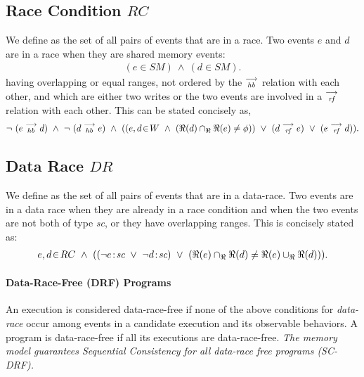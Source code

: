         \subsection{Race Condition $RC$} 
            We define  as the set of all pairs of events that are in a race. 
            Two events $e$ and $d$ are in a race when they are shared memory events:
            \begin{align*}
                (e \in SM)\ \wedge\ (d \in SM).
            \end{align*}
            having overlapping or equal ranges, not ordered by the $\stackrel{\longrightarrow}{_\textit{hb}}$ relation with each other, and which are either two writes or the two events are involved in a $\stackrel{\longrightarrow}{_\textit{rf}}$ relation with each other. 
            This can be stated concisely as,
            \begin{align*}
                \neg \ (\reln{e}{hb}{d})\ \wedge\ \neg \ (\reln{d}{hb}{e}) 
                \ \wedge \ 
                (
                (\event{e,d}{W}\  \wedge\ (\Re(d) \cap_{\Re} \Re(e) \neq \phi)) 
                    \  \vee\ (d \stck{_\textit{rf}} e)\ \vee\ (e \stck{_\textit{rf}} d)
                ).
            \end{align*}
                    
        \subsection{Data Race $DR$} 
            We define  as the set of all pairs of events that are in a data-race. 
            Two events are in a data race when they are already in a race condition and when the two events are not both of type \textit{sc}, or they have overlapping ranges. 
            This is concisely stated as:  
            \begin{align*}
                \event{e,d}{RC}  \ \wedge \ 
                ((\neg\et{e}{sc} \ \vee \ \neg\et{d}{sc}) \ \vee \ 
                (\Re(e) \cap_{\Re} \Re(d) \neq \Re(e) \cup_{\Re} \Re(d))). 
            \end{align*}
            
        \paragraph{Data-Race-Free (DRF) Programs}
            An execution is considered data-race-free if none of the above conditions for \textit{data-race} occur among events in a candidate execution and its observable behaviors. 
            A program is data-race-free if all its executions are data-race-free.          
            \textit{The memory model guarantees Sequential Consistency for all data-race free programs (SC-DRF).}      